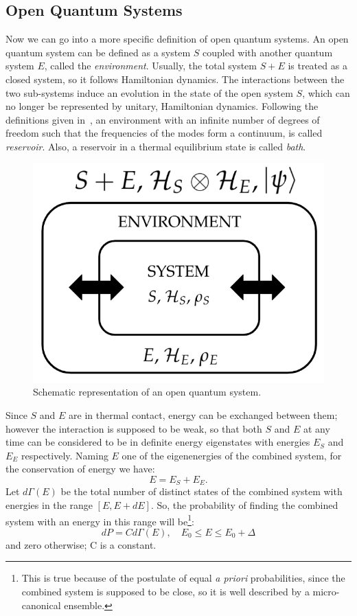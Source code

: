 \subsection{Open Quantum Systems}
Now we can go into a more specific definition of open quantum systems. An open quantum system can be defined as a system $S$ coupled with another quantum system $E$, called the \emph{environment}. Usually, the total system $S+E$ is treated as a closed system, so it follows Hamiltonian dynamics. The interactions between the two sub-systems induce an evolution in the state of the open system $S$, which can no longer be represented by unitary, Hamiltonian dynamics. Following the definitions given in~\cite{pet_breuer:open_quantum}, an environment with an infinite number of degrees of freedom such that the frequencies of the modes form a continuum, is called \emph{reservoir}. Also, a reservoir in a thermal equilibrium state is called \emph{bath}.

\begin{figure}
    \centering
    \includegraphics[scale=0.5]{Figures/openSystems_sketch.png}
    \caption{Schematic representation of an open quantum system.}
    \label{fig:openSystems_sketch}
\end{figure}

Since $S$ and $E$ are in thermal contact, energy can be exchanged between them; however the interaction is supposed to be weak, so that both $S$ and $E$ at any time can be considered to be in definite energy eigenstates with energies $E_S$ and $E_E$ respectively. Naming $E$ one of the eigenenergies of the combined system, for the conservation of energy we have:
\begin{equation*}
    E = E_S + E_E.
\end{equation*}
Let $d\Gamma(E)$ be the total number of distinct states of the combined system with energies in the range $[E, E+dE]$. So, the probability of finding the combined system with an energy in this range will be\footnote{This is true because of the postulate of equal \emph{a priori} probabilities, since the combined system is supposed to be close, so it is well described by a micro-canonical ensemble.}:
\begin{equation}
    dP = C d\Gamma(E), \quad E_0 \leq E \leq E_0 + \Delta
\end{equation}
and zero otherwise; C is a constant.

